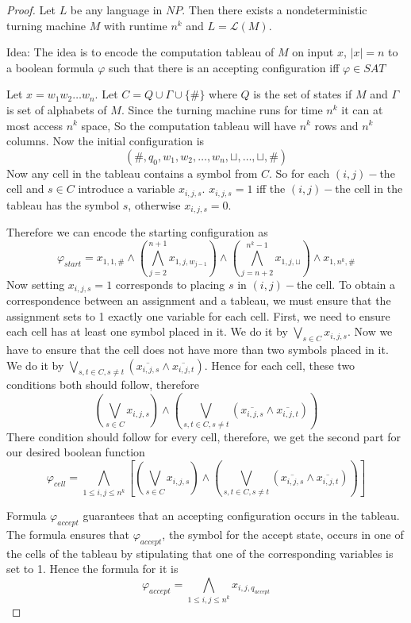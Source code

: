 \documentclass{article}
\begin{document}
\begin{proof}
		Let \(L\) be any language in \(NP\). Then there exists a nondeterministic turning machine \(M\) with runtime \(n^k\) and \(L=\mathcal{L}(M)\).
	
	Idea: The idea is to encode the computation tableau of \(M\) on input \(x\), \(|x|=n\) to a boolean formula \(\varphi\) such that there is an accepting configuration iff \(\varphi \in SAT\)
	
	
	
	Let \(x=w_1w_2\dots w_n\). Let \(C=Q\cup \Gamma\cup \{\#\}\) where \(Q\) is the set of states if \(M\) and \(\Gamma\) is set of alphabets of \(M\). Since the turning machine runs for time \(n^k\) it can at most access \(n^k\) space, So the computation tableau will have \(n^k \) rows and \(n^k\) columns. Now the initial configuration is \[(\#,q_0,w_1,w_2,\dots,w_n,\sqcup,\dots,\sqcup,\#)\]Now any cell in the tableau contains a symbol from \(C\). So for each \((i,j)-\)the cell and \(s\in C\) introduce a variable \(x_{i,j,s}\). \(x_{i,j,s}=1\) iff the \((i,j)-\)the cell in the tableau has the symbol \(s\), otherwise \(x_{i,j,s}=0\).
	
	
	
	Therefore we can encode the starting configuration as \[\varphi_{start}=x_{1,1,\#}\wedge \left( \bigwedge_{j=2}^{n+1} x_{1,j,w_{j-1}} \right) \wedge \left( \bigwedge_{j=n+2}^{n^k-1} x_{1, j,\sqcup} \right)\wedge x_{1,n^k,\#}\]Now setting \(x_{i,j,s} =1\) corresponds to placing \(s\) in \((i,j)-\)the cell. To obtain a correspondence between an assignment and a tableau, we must ensure that the assignment sets to 1 exactly one variable for each cell. First, we need to ensure each cell has at least one symbol placed in it. We do it by \(\bigvee\limits_{s\in C} x_{i,j,s}\). Now we have to ensure that the cell does not have more than two symbols placed in it. We do it by \(\bigvee\limits_{s,t\in C, s\neq t} (\overline{x_{i,j,s}}\wedge\overline{x_{i,j,t}})\). Hence for each cell, these two conditions both should follow, therefore \[\left(\bigvee\limits_{s\in C} x_{i,j,s}\right) \wedge \left( \bigvee\limits_{s,t\in C, s\neq t} (\overline{x_{i,j,s}}\wedge\overline{x_{i,j,t}})\right)\]There condition should follow for every cell, therefore, we get the second part for our desired boolean function \[ \varphi_{cell}=\bigwedge_{1\leq i,j\leq n^k}\left[ \left(\bigvee\limits_{s\in C} x_{i,j,s}\right) \wedge \left( \bigvee\limits_{s,t\in C, s\neq t} (\overline{x_{i,j,s}}\wedge\overline{x_{i,j,t}})\right)\right]\]
	
	Formula \(\varphi_{accept}\) guarantees that an accepting configuration occurs in the tableau. The formula ensures that \(\varphi_{accept}\), the symbol for the accept state, occurs in one of the cells of the tableau by stipulating that one of the corresponding variables is set to 1. Hence the formula for it is \[\varphi_{accept}=\bigwedge_{1\leq i,j\leq n^k} x_{i,j,q_{accept}}\]
\end{proof}
\pagebreak



\end{document}
